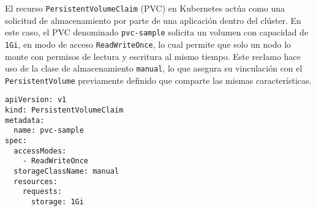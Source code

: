 El recurso \texttt{PersistentVolumeClaim} (PVC) en Kubernetes actúa como una solicitud de almacenamiento por parte de una aplicación dentro del clúster. En este caso, el PVC denominado \texttt{pvc-sample} solicita un volumen con capacidad de \texttt{1Gi}, en modo de acceso \texttt{ReadWriteOnce}, lo cual permite que solo un nodo lo monte con permisos de lectura y escritura al mismo tiempo. Este reclamo hace uso de la clase de almacenamiento \texttt{manual}, lo que asegura su vinculación con el \texttt{PersistentVolume} previamente definido que comparte las mismas características.

\begin{verbatim}
apiVersion: v1
kind: PersistentVolumeClaim
metadata:
  name: pvc-sample
spec:
  accessModes:
    - ReadWriteOnce
  storageClassName: manual
  resources:
    requests:
      storage: 1Gi
\end{verbatim}